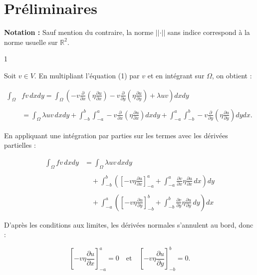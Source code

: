 \section{Préliminaires}

\textbf{Notation :} Sauf mention du contraire, la norme $\vert \vert \cdot \vert \vert$ sans indice correspond à la norme usuelle sur $\mathbb{R}^2$.


\begin{reponse}{1}

Soit $v \in V$. En multipliant l'équation (1) par $v$ et en intégrant sur $\Omega$, on obtient :

\begin{align*}
    \int_{\Omega} & f v \, dxdy = \int_{\Omega} \left( -v \frac{\partial}{\partial x} \left( \eta \frac{\partial u}{\partial x} \right) - v \frac{\partial}{\partial y} \left( \eta \frac{\partial u}{\partial y} \right) + \lambda u v \right) dxdy \\ \\
    & = \int_{\Omega} \lambda u v \, dxdy + \int_{-b}^{b} \int_{-a}^{a} -v \frac{\partial}{\partial x} \left( \eta \frac{\partial u}{\partial x} \right) dx dy + \int_{-a}^{a} \int_{-b}^{b} -v \frac{\partial}{\partial y} \left( \eta \frac{\partial u}{\partial y} \right) dy dx.
\end{align*}

En appliquant une intégration par parties sur les termes avec les dérivées partielles :

\begin{align*}
    \int_{\Omega} f v \, dxdy &= \int_{\Omega} \lambda u v \, dxdy \\ \\
    &\quad + \int_{-b}^{b} \left( \left[ -v \eta \frac{\partial u}{\partial x} \right]_{-a}^{a} + \int_{-a}^{a} \frac{\partial v}{\partial x} \eta \frac{\partial u}{\partial x} \, dx \right) dy \\ \\
    &\quad + \int_{-a}^{a} \left( \left[ -v \eta \frac{\partial u}{\partial y} \right]_{-b}^{b} + \int_{-b}^{b} \frac{\partial v}{\partial y} \eta \frac{\partial u}{\partial y} \, dy \right) dx
\end{align*}

D'après les conditions aux limites, les dérivées normales s'annulent au bord, donc :

\[
    \left[ -v \eta \frac{\partial u}{\partial x} \right]_{-a}^{a} = 0 \quad \text{et} \quad \left[ -v \eta \frac{\partial u}{\partial y} \right]_{-b}^{b} = 0.
\]


\end{reponse}
